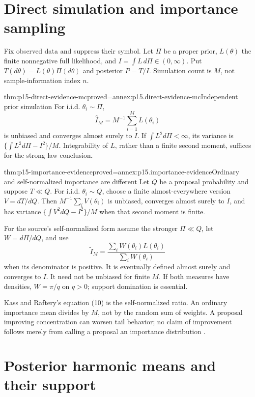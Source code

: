 \section{Direct simulation and importance sampling}
\label{sec:p15-evidence-monte-carlo}

Fix observed data and suppress their symbol. Let \(\Pi\) be a proper prior,
\(L(\theta)\) the finite nonnegative full likelihood, and
\(I=\int L\,d\Pi\in(0,\infty)\). Put \(T(d\theta)=L(\theta)\Pi(d\theta)\)
and posterior \(P=T/I\). Simulation count is \(M\), not sample-information
index \(n\).

\begin{hbtheorem}{thm:p15-direct-evidence-mc}{proved=annex:p15.direct-evidence-mc}{Independent prior simulation}
For i.i.d. \(\theta_i\sim\Pi\),
\[
 \widehat I_M=M^{-1}\sum_{i=1}^M L(\theta_i)
\]
is unbiased and converges almost surely to \(I\).
If \(\int L^2d\Pi<\infty\), its variance is
\(\{\int L^2d\Pi-I^2\}/M\). Integrability of \(L\), rather than a
finite second moment, suffices for the strong-law conclusion.
\end{hbtheorem}

\begin{hbtheorem}{thm:p15-importance-evidence}{proved=annex:p15.importance-evidence}{Ordinary and self-normalized importance are different}
Let \(Q\) be a proposal probability and suppose \(T\ll Q\).
For i.i.d. \(\theta_i\sim Q\), choose a finite almost-everywhere version
\(V=dT/dQ\). Then \(M^{-1}\sum_iV(\theta_i)\) is unbiased, converges
almost surely to \(I\), and has variance
\(\{\int V^2dQ-I^2\}/M\) when that second moment is finite.

For the source's self-normalized form assume the stronger
\(\Pi\ll Q\), let \(W=d\Pi/dQ\), and use
\[
 \widetilde I_M=
 \frac{\sum_iW(\theta_i)L(\theta_i)}{\sum_iW(\theta_i)}
\]
when its denominator is positive. It is eventually defined almost surely
and converges to \(I\). It need not be unbiased for finite \(M\).
If both measures have densities, \(W=\pi/q\) on \(q>0\);
support domination is essential.
\end{hbtheorem}

Kass and Raftery's equation (10) is the self-normalized ratio. An ordinary
importance mean divides by \(M\), not by the random sum of weights.
A proposal improving concentration can worsen tail behavior; no claim of
improvement follows merely from calling a proposal an importance distribution
\cite[Sec.~4.2]{KassRaftery1995BayesFactors}.

\section{Posterior harmonic means and their support}
\label{sec:p15-harmonic-evidence}

